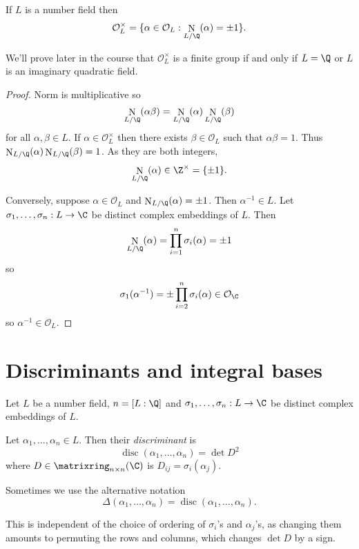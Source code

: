 \documentclass[a4paper]{article}
\renewcommand*{\O}{\mathcal{O}}
\DeclareMathOperator{\n}{N}
\DeclareMathOperator{\disc}{disc}
\begin{document}
\begin{lemma}
  If \(L\) is a number field then
  \[
    \O_L^\times = \{\alpha \in \O_L: \n_{L/\Q}(\alpha) = \pm 1\}.
  \]
\end{lemma}

\begin{remark}
  We'll prove later in the course that \(\O_L^\times\) is a finite group if and only if \(L = \Q\) or \(L\) is an imaginary quadratic field.
\end{remark}

\begin{proof}
  Norm is multiplicative so
  \[
    \n_{L/\Q}(\alpha\beta) = \n_{L/\Q}(\alpha)\n_{L/\Q}(\beta)
  \]
  for all \(\alpha, \beta \in L\). If \(\alpha \in \O_L^\times\) then there exists \(\beta \in \O_L\) such that \(\alpha\beta = 1\). Thus \(\n_{L/\Q}(\alpha)\n_{L/\Q}(\beta) = 1\). As they are both integers,
  \[
    \n_{L/\Q}(\alpha) \in \Z^\times = \{\pm 1\}.
  \]

  Conversely, suppose \(\alpha \in \O_L\) and \(\n_{L/\Q}(\alpha) = \pm 1\). Then \(\alpha^{-1} \in L\). Let \(\sigma_1, \dots, \sigma_n: L \to \C\) be distinct complex embeddings of \(L\). Then
  \[
    \n_{L/\Q}(\alpha) = \prod_{i = 1}^n \sigma_i(\alpha) = \pm 1
  \]
  so
  \[
    \sigma_1(\alpha^{-1}) = \pm \prod_{i = 2}^n \sigma_i(\alpha) \in \O_\C
  \]
  so \(\alpha^{-1} \in \O_L\).
\end{proof}

\section{Discriminants and integral bases}

Let \(L\) be a number field, \(n = [L:\Q]\) and \(\sigma_1, \dots, \sigma_n: L \to \C\) be distinct complex embeddings of \(L\).

\begin{definition}[Discriminant]
  Let \(\alpha_1, \dots, \alpha_n \in L\). Then their \emph{discriminant} is
  \[
    \disc(\alpha_1, \dots, \alpha_n) = \det D^2
  \]
  where \(D \in \matrixring_{n \times n}(\C)\) is \(D_{ij} = \sigma_i(\alpha_j)\).
\end{definition}

\begin{notation}
  Sometimes we use the alternative notation
  \[
    \Delta(\alpha_1, \dots, \alpha_n) = \disc(\alpha_1, \dots, \alpha_n).
  \]
\end{notation}

\begin{note}
  This is independent of the choice of ordering of \(\sigma_i\)'s and \(\alpha_j\)'s, as changing them amounts to permuting the rows and columns, which changes \(\det D\) by a sign.
\end{note}
\end{document}
